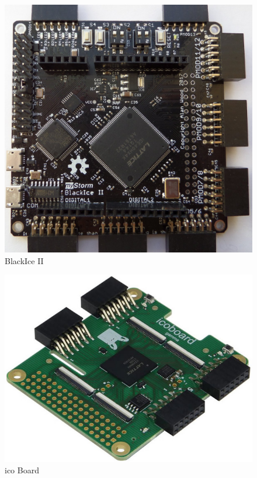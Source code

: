 \begin{center}
	\begin{figure}[H]
		\center
		\includegraphics[trim = 0mm 0mm 0mm 0mm, clip,scale=0.1]{imagenes/EstadoArte/BlackIce.jpg}
		\caption{BlackIce II}
		\label{fig:blackIceII}
	\end{figure}
\end{center}
\begin{center}
	\begin{figure}[H]
		\center
		\includegraphics[trim = 0mm 0mm 0mm 0mm, clip,scale=0.3]{imagenes/EstadoArte/ico_board.jpg}
		\caption{ico Board}
		\label{fig:icoBoard}
	\end{figure}
\end{center}

